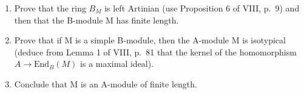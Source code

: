 \begin{enumerate}
\def\labelenumi{\alph{enumi})}
\item
  Prove that the ring \(B_{M}\) is left Artinian (use Proposition 6 of VIII, p.~9) and then that the B-module M has finite length.
\item
  Prove that if M is a simple B-module, then the A-module M is isotypical (deduce from Lemma 1 of VIII, p.~81 that the kernel of the homomorphism \(A \rightarrow \text{End}_{B}(M)\) is a maximal ideal).
\item
  Conclude that M is an A-module of finite length.
\end{enumerate}

